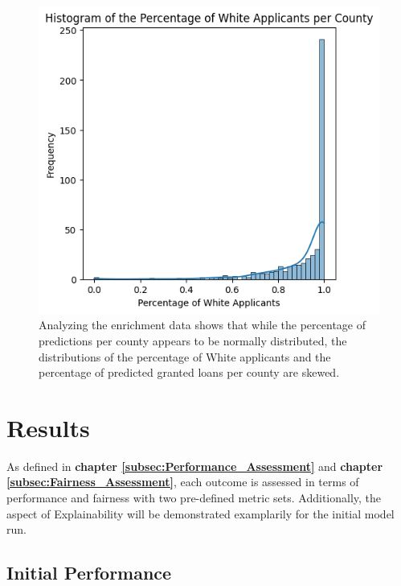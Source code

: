 \begin{figure}[h]
\begin{minipage}{0.33\textwidth}
    \end{minipage}\hfill
    \begin{minipage}{0.33\textwidth}
        \centering
        \includegraphics[width=\textwidth]{images/geo_enrich/white_per_county.png}
    \end{minipage}\hfill
    \label{fig:Enrichment_Data_EDA}
    \caption*{Analyzing the enrichment data shows that while the percentage of predictions per county appears to be normally distributed, the distributions of the percentage of White applicants and the percentage of predicted granted loans per county are skewed.}
\end{figure}


\section{Results}\label{sec:Results}        

As defined in \textbf{chapter \ref{subsec:Performance_Assessment}} and \textbf{chapter \ref{subsec:Fairness_Assessment}}, each outcome is assessed in terms of performance and fairness with two pre-defined metric sets. Additionally, the aspect of Explainability will be demonstrated examplarily for the initial model run.

\subsection{Initial Performance}\label{subsec:Initial_Performance}

